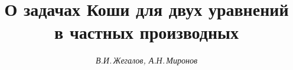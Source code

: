 




%


\newcommand{\tts}[1]{}







\setcounter{page}{23}















\author{\it В.И.\,Жегалов, А.Н.\,Миронов}




\title{О задачах Коши для двух уравнений\\


в частных производных}





\date{}




\pagestyle{plain} %







\maketitle


\label{begin}












